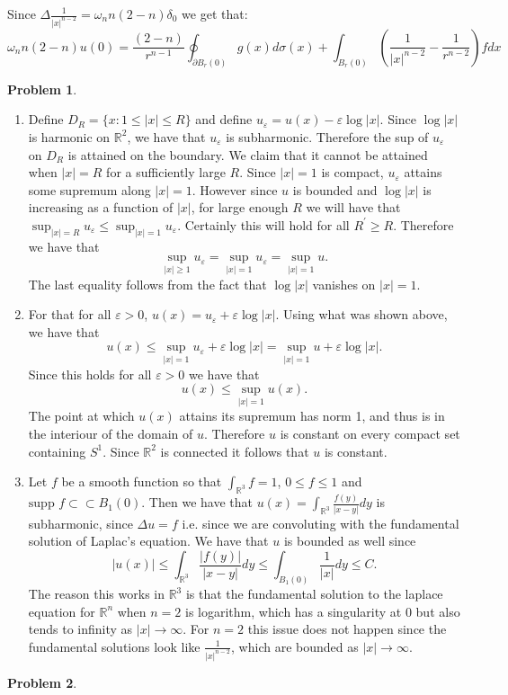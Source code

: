 \documentclass[12pt, a4paper]{article}
\newtheorem{problem}{Problem}
\theoremstyle{definition}
\newcommand{\penum}{ \begin{enumerate}[label=\bf(\alph*), leftmargin=0pt]}
\newcommand{\epenum}{ \end{enumerate} }
\newcommand{\R}{\mathbb{R}}                           %
\newcommand{\bd}{\partial}
\newcommand{\ep}{\varepsilon}
\begin{document}
Since $\Delta \frac{1}{|x|^{n-2}}= \omega_n n(2-n)\delta_0$ we get that:
$$\omega_n n(2-n) u(0) = \frac{(2-n)}{r^{n-1}} \oint_{\bd B_r(0)}g(x)d\sigma(x) + \int_{B_r(0)} \left( \frac{1}{|x|^{n-2}} - \frac{1}{r^{n-2}}\right) f dx  $$
\newpage
\begin{problem}
\end{problem}
\penum
\item Define $D_R = \{x:  1 \leq |x| \leq R\}$ and define $u_\ep  = u(x) - \ep \log|x|$.  Since $\log|x|$ is harmonic on $\R^2$, we have that $u_\ep$ is subharmonic. 
Therefore the sup of $u_\ep$ on $D_R$ is attained on the boundary. We claim that it cannot be attained when $|x| = R$ for a sufficiently large $R$. Since $|x|= 1$ is compact, $u_\ep$ attains some supremum along $|x|=1$. However since $u$ is bounded and $\log |x|$ is increasing as a function of $|x|$, for large enough $R$ we will have that $\sup_{|x| = R} u_\ep  \leq  \sup_{|x| = 1} u_\ep$. Certainly this will hold for all $R^\prime \geq R$. Therefore we have that 
$$\sup_{|x|\geq 1} u_\ep = \sup_{|x| = 1} u_\ep = \sup_{|x| = 1}u.$$
The last equality follows from the fact that $\log|x|$ vanishes on $|x|=1$. 
\item 
For that for all $\ep >0$, $u(x) = u_\ep + \ep \log |x|$. Using what was shown above, we have that 
$$u(x) \leq \sup_{|x| = 1} u_\ep + \ep \log |x| = \sup_{|x| = 1} u + \ep \log |x|. $$
Since this holds for all $\ep>0$ we have that 
$$u(x) \leq \sup_{|x| = 1} u(x).$$
The point at which $u(x)$ attains its supremum has norm 1, and thus is in the interiour of the domain of $u$. Therefore $u$ is constant on every compact set containing $S^1$. Since $\R^2$ is connected it follows that $u$ is constant. 
\item 
Let $f$ be a smooth function so that $\int_{\R^3} f =1$, $0 \leq f \leq 1$ and $\text{supp } f \subset \subset B_1(0)$. Then we have that $u(x) = \int_{\R^3} \frac{f(y)}{|x-y|} dy$ is subharmonic, since $\Delta u = f$ i.e. since we are convoluting with the fundamental solution of Laplac's equation. We have that $u$ is bounded as well since 
$$|u(x)| \leq \int_{\R^3} \frac{|f(y)|}{|x-y|} dy \leq \int_{B_1(0)} \frac{1}{|x|} dy \leq C. $$
The reason this works in $\R^3$ is that the fundamental solution to the laplace equation for $\R^n$ when $n=2$ is logarithm, which has a singularity at $0$ but also tends to infinity as $|x|\to \infty$. For $n=2$ this issue does not happen since the fundamental solutions look like $\frac{1}{|x|^{n-2}}$, which are bounded as $|x| \to \infty$. 
\epenum
\newpage
\begin{problem}
\end{problem}
\end{document}

